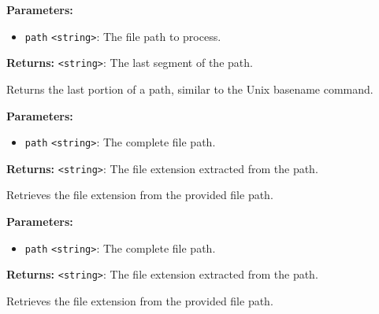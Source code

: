 \documentclass[12pt,a4paper]{article}
\begin{document}
\vspace{5mm}
\noindent {}


\noindent \textbf{Parameters:}
\begin{itemize}
  \item \texttt{path} \texttt{<string>}: The file path to process.
\end{itemize}

\noindent \textbf{Returns:} \texttt{<string>}: The last segment of the path.

\noindent Returns the last portion of a path, similar to the Unix \textasciigrave{}basename\textasciigrave{} command.

\vspace{5mm}
\noindent {}


\noindent \textbf{Parameters:}
\begin{itemize}
  \item \texttt{path} \texttt{<string>}: The complete file path.
\end{itemize}

\noindent \textbf{Returns:} \texttt{<string>}: The file extension extracted from the path.

\noindent Retrieves the file extension from the provided file path.

\vspace{5mm}
\noindent {}


\noindent \textbf{Parameters:}
\begin{itemize}
  \item \texttt{path} \texttt{<string>}: The complete file path.
\end{itemize}

\noindent \textbf{Returns:} \texttt{<string>}: The file extension extracted from the path.

\noindent Retrieves the file extension from the provided file path.

\vspace{5mm}
\noindent {}
\end{document}
